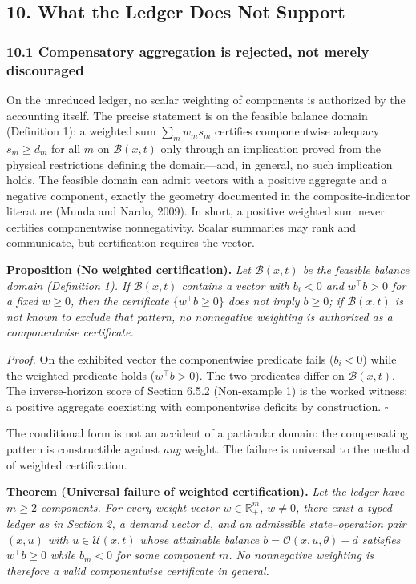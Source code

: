 \documentclass[11pt]{article}
\begin{document}
\subsection{10. What the Ledger Does Not
Support}\label{what-the-ledger-does-not-support}

\subsubsection{10.1 Compensatory aggregation is rejected, not merely
discouraged}\label{compensatory-aggregation-is-rejected-not-merely-discouraged}

On the unreduced ledger, no scalar weighting of components is authorized by the accounting itself. The precise statement is on the feasible balance domain (Definition 1): a weighted sum \(\sum_m w_m s_m\) certifies componentwise adequacy \(s_m \ge d_m\) for all \(m\) on \(\mathcal{B}(x,t)\) only through an implication proved from the physical restrictions defining the domain---and, in general, no such implication holds. The feasible domain can admit vectors with a positive aggregate and a negative component, exactly the geometry documented in the composite-indicator literature (Munda and Nardo, 2009). In short, a positive weighted sum never certifies componentwise nonnegativity. Scalar summaries may rank and communicate, but certification requires the vector.

\textbf{Proposition (No weighted certification).} \emph{Let
\(\mathcal{B}(x,t)\) be the feasible balance domain (Definition 1). If
\(\mathcal{B}(x,t)\) contains a vector with \(b_i < 0\) and
\(w^\top b > 0\) for a fixed \(w \ge 0\), then the certificate
\(\{w^\top b \ge 0\}\) does not imply \(b \ge 0\); if
\(\mathcal{B}(x,t)\) is not known to exclude that pattern, no
nonnegative weighting is authorized as a componentwise certificate.}

\emph{Proof.} On the exhibited vector the componentwise predicate fails (\(b_i < 0\)) while the weighted predicate holds (\(w^\top b > 0\)). The two predicates differ on \(\mathcal{B}(x,t)\). The inverse-horizon score of Section 6.5.2 (Non-example 1) is the worked witness: a positive aggregate coexisting with componentwise deficits by construction. \ensuremath{\square}

The conditional form is not an accident of a particular domain: the compensating pattern is constructible against \emph{any} weight. The failure is universal to the method of weighted certification.

\textbf{Theorem (Universal failure of weighted certification).}
\emph{Let the ledger have \(m \ge 2\) components. For every weight
vector \(w \in \mathbb{R}_+^m\), \(w \neq 0\), there exist a typed
ledger as in Section 2, a demand vector \(d\), and an admissible
state--operation pair \((x, u)\) with \(u \in \mathcal{U}(x,t)\) whose
attainable balance \(b = \mathcal{O}(x,u,\theta) - d\) satisfies
\(w^\top b \ge 0\) while \(b_m < 0\) for some component \(m\). No
nonnegative weighting is therefore a valid componentwise certificate in
general.}
\end{document}
